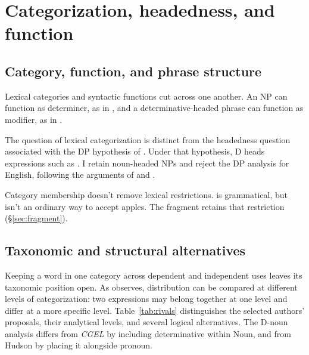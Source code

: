 \documentclass[12pt]{article}
\begin{document}
\section{Categorization, headedness, and function}\label{sec:alternatives}

\subsection{Category, function, and phrase structure}\label{sec:category-function}

Lexical categories and syntactic functions cut across one another. An NP can function as determiner, as in , and a determinative-headed phrase can function as modifier, as in  \citep{payne2010,pullummiller2022nps}.

The question of lexical categorization is distinct from the headedness question associated with the DP hypothesis of \textcite{abney1987}. Under that hypothesis, D heads expressions such as . I retain noun-headed NPs and reject the DP analysis for English, following the arguments of \textcite{pullummiller2022nps} and \textcite{bruening2020nominal}.

Category membership doesn't remove lexical restrictions.  is grammatical, but  isn't an ordinary way to accept apples. The fragment retains that restriction (§\ref{sec:fragment}).

\subsection{Taxonomic and structural alternatives}\label{sec:related}

Keeping a word in one category across dependent and independent uses leaves its taxonomic position open. As \textcite[232--235]{lyons1968} observes, distribution can be compared at different levels of categorization: two expressions may belong together at one level and differ at a more specific level. Table~\ref{tab:rivals} distinguishes the selected authors' proposals, their analytical levels, and several logical alternatives. The D-noun analysis differs from \textit{CGEL} by including determinative within Noun, and from Hudson by placing it alongside pronoun.
\end{document}
